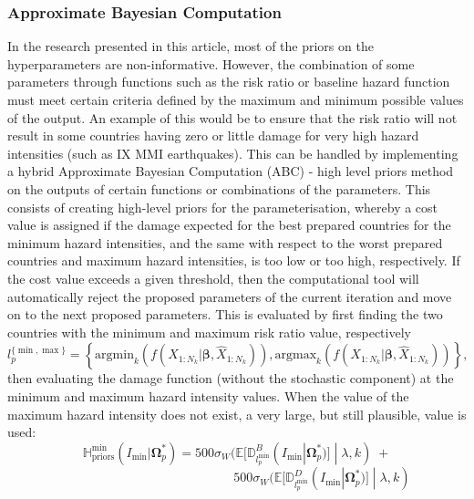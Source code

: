 \documentclass[10pt,a4paper]{article}
\begin{document}
\begin{multicols}{1}
\subsubsection{Approximate Bayesian Computation}\label{sec:highpriors}
In the research presented in this article, most of the priors on the hyperparameters are non-informative. However, the combination of some parameters through functions such as the risk ratio or baseline hazard function must meet certain criteria defined by the maximum and minimum possible values of the output. An example of this would be to ensure that the risk ratio will not result in some countries having zero or little damage for very high hazard intensities (such as IX MMI earthquakes). This can be handled by implementing a hybrid Approximate Bayesian Computation (ABC) - high level priors method on the outputs of certain functions or combinations of the parameters. This consists of creating high-level priors for the parameterisation, whereby a cost value is assigned if the damage expected for the best prepared countries for the minimum hazard intensities, and the same with respect to the worst prepared countries and maximum hazard intensities, is too low or too high, respectively. If the cost value exceeds a given threshold, then the computational tool will automatically reject the proposed parameters of the current iteration and move on to the next proposed parameters. This is evaluated by first finding the two countries with the minimum and maximum risk ratio value, respectively
\begin{equation}
  l_p^{\{\min,\max\}}=\left\{\text{argmin}_k\left(f(X_{1:N_k}|\boldsymbol{\beta},\hat{X}_{1:N_k})\right),\text{argmax}_k\left(f(X_{1:N_k}|\boldsymbol{\beta},\hat{X}_{1:N_k})\right)\right\},
\end{equation}
then evaluating the damage function (without the stochastic component) at the minimum and maximum  hazard intensity values. When the value of the maximum hazard intensity does not exist, a very large, but still plausible, value is used:
\begin{equation}
  \mathbb{H}_{\text{priors}}^{\min}(I_{\min}|\boldsymbol{\Omega}^*_p)=500\sigma_W(\mathbb{E}[\mathbb{D}^B_{l_p^{\min}}(I_{\min}|\boldsymbol{\Omega}^*_p)]\;|\;\lambda,k)\; +
\end{equation}
\begin{equation}
\;\;\;\;\;\;\;\;\;\;\;\;\;\;\;\;\;\;\;\;\;\;\;\;\;\;\;\;\;\;\;\;\;\;\;\;\;\;\;\;\;\;\;\;\;\;\;\;500\sigma_W(\mathbb{E}[\mathbb{D}^D_{l_p^{\min}}(I_{\min}|\boldsymbol{\Omega}^*_p)]\;|\;\lambda,k)

\end{equation}
\end{multicols}
\end{document}

